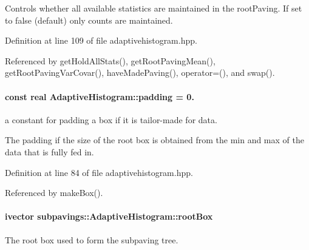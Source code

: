 \-Controls whether all available statistics are maintained in the root\-Paving. \-If set to false (default) only counts are maintained. 



\-Definition at line 109 of file adaptivehistogram.\-hpp.



\-Referenced by get\-Hold\-All\-Stats(), get\-Root\-Paving\-Mean(), get\-Root\-Paving\-Var\-Covar(), have\-Made\-Paving(), operator=(), and swap().

\hypertarget{classsubpavings_1_1AdaptiveHistogram_a73e006381e43e152b7dbb63211a3ac09}{
\paragraph[{padding}]{\setlength{\rightskip}{0pt plus 5cm}const real {\bf \-Adaptive\-Histogram\-::padding} = 0.}}\label{classsubpavings_1_1AdaptiveHistogram_a73e006381e43e152b7dbb63211a3ac09}


a constant for padding a box if it is tailor-\/made for data. 

\-The padding if the size of the root box is obtained from the min and max of the data that is fully fed in. 

\-Definition at line 84 of file adaptivehistogram.\-hpp.



\-Referenced by make\-Box().

\hypertarget{classsubpavings_1_1AdaptiveHistogram_a5afac4246153fef0b383f6eb2e9d23a6}{
\paragraph[{root\-Box}]{\setlength{\rightskip}{0pt plus 5cm}ivector {\bf subpavings\-::\-Adaptive\-Histogram\-::root\-Box}}}\label{classsubpavings_1_1AdaptiveHistogram_a5afac4246153fef0b383f6eb2e9d23a6}


\-The root box used to form the subpaving tree. 

